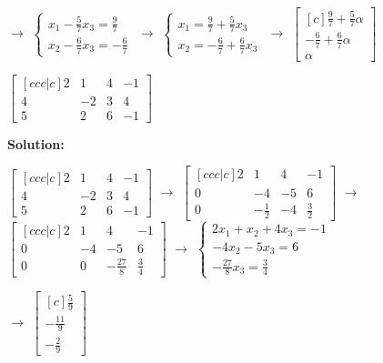 \begin{outline}[enumerate]
  $\rightarrow$ 
$ \begin{cases} x_1 - \frac{5}{7}x_3 = \frac{9}{7} \\  x_2 - \frac{6}{7}x_3 = -\frac{6}{7}   \end{cases} $  
 $\rightarrow$ 
$ \begin{cases} x_1 = \frac{9}{7} + \frac{5}{7}x_3 \\  x_2 = -\frac{6}{7} + \frac{6}{7}x_3 \end{cases} $
$\rightarrow$
$\begin{bmatrix} [c]
\frac{9}{7} + \frac{5}{7}\alpha \\
-\frac{6}{7} + \frac{6}{7}\alpha \\
\alpha 
\end{bmatrix} $ 
  




\2  $  \begin{bmatrix} [ccc|c]
2 & 1 & 4 & -1 \\
4 & -2 & 3 &  4 \\
5 & 2 & 6 &  -1
  \end{bmatrix} $  
  
\bf{Solution:}
  
$  \begin{bmatrix} [ccc|c]
2 & 1 & 4 & -1 \\
4 & -2 & 3 &  4 \\
5 & 2 & 6 &  -1
  \end{bmatrix} $
  $\rightarrow$
$  \begin{bmatrix} [ccc|c]
2 & 1 & 4 & -1 \\
0 & -4 & -5 &  6 \\
0 & -\frac{1}{2} & -4 & \frac{3}{2}
  \end{bmatrix} $  
  $\rightarrow$
$  \begin{bmatrix} [ccc|c]
2 & 1 & 4 & -1 \\
0 & -4 & -5 &  6 \\
0 & 0 & -\frac{27}{8} & \frac{3}{4}
  \end{bmatrix} $    
  $\rightarrow$
$ \begin{cases} 2x_1 + x_2 + 4x_3 = -1 \\  -4x_2 - 5x_3 = 6 \\ -\frac{27}{8}x_3 = \frac{3}{4}   \end{cases} $

$\rightarrow$
$\begin{bmatrix} [c]
\frac{5}{9} \\ 
-\frac{11}{9}\\ 
-\frac{2}{9}
\end{bmatrix} $ 








\end{outline}
